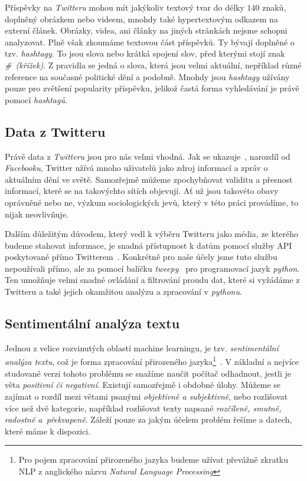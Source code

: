 \documentclass[12pt, a4paper]{article}
\numberwithin{equation}{section} 	%
\begin{document}
Příspěvky na \textit{Twitteru} mohou mít jakýkoliv textový tvar do délky $140$ znaků, doplněný obrázkem nebo videem, mnohdy také hypertextovým odkazem na externí článek. Obrázky, videa, ani články na jiných stránkách nejsme schopni analyzovat. Plně však zkoumáme textovou část příspěvků. Ty bývají doplněné o tzv. \textit{hashtagy}. To jsou slova nebo krátká spojení slov, před kterými stojí znak \textit{\#~(křížek)}. Z pravidla se jedná o slova, která jsou velmi aktuální, nepříklad různé reference na současné politické dění a podobně. Mnohdy jsou \textit{hashtagy} užívány pouze pro zvětšení popularity příspěvku, jelikož častá forma vyhledávání je právě pomocí \textit{hashtagů}.

\subsection{Data z Twitteru}
\noindent Právě data z \textit{Twitteru} jsou pro nás velmi vhodná. Jak se ukazuje~\cite{whyNotFb}, narozdíl od \textit{Facebooku}, Twitter užívá mnoho uživatelů jako zdroj informací a zpráv o aktuálním dění ve světě. Samozřejmě můžeme zpochybňovat validitu a přesnost informací, které se na takovýchto sítích objevují. Ať už jsou takovéto obavy oprávněné nebo ne, výzkum sociologických jevů, který v této práci provádíme, to nijak neovlivňuje.

Dalším důležitým důvodem, který vedl k výběru Twitteru jako média, ze kterého budeme stahovat informace, je snadná přístupnost k datům pomocí služby API poskytované přímo Twitterem~\cite{twitterAPI}. Konkrétně pro naše účely jsme tuto službu nepoužívali přímo, ale za pomocí balíčku \textit{tweepy}~\cite{tweepy} pro programovací jazyk \textit{python}. Ten umožňuje velmi snadné ovládání a filtrování proudu dat, které si vyžádáme z Twitteru a také jejich okamžitou analýzu a zpracování v \textit{pythonu}.

\subsection{Sentimentální analýza textu}
\noindent Jednou z velice rozvinutých oblastí machine learningu, je tzv. \textit{sentimentální a\-na\-lý\-za textu}, což je forma zpracování přirozeného jazyka\footnote{Pro pojem zpracování přirozeného jazyka budeme užívat převážně zkratku NLP z anglického názvu \textit{Natural Language Processing}}~\cite{NLTKbook}. V základní a nejvíce studované verzi tohoto problému se snažíme naučit počítač odhadnout, jestli je věta \textit{positivní či negativní}. Existují samozřejmě i obdobné úlohy. Můžeme se zajímat o rozdíl mezi větami psanými \textit{objektivně a subjektivně}, nebo rozlišovat více než dvě kategorie, například rozlišovat texty napsané \textit{rozčíleně, smutně, radostně a~překvapeně}. Záleží pouze za jakým účelem problém řešíme a datech, které máme k dispozici.
\end{document}
